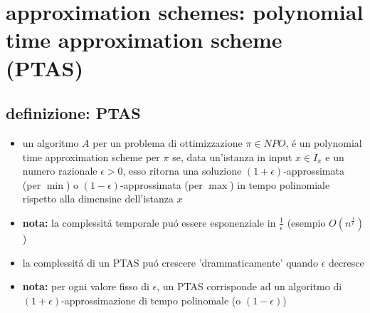 \section*{approximation schemes: polynomial time approximation scheme (PTAS)}


\subsection*{definizione: PTAS}
\begin{flushleft}
	\begin{itemize}
		\item un algoritmo $A$ per un problema di ottimizzazione $\pi\in NPO$, \'e un polynomial time approximation scheme per $\pi$ se, data un'istanza in input $x\in I_\pi$ e un numero razionale $\epsilon>0$, esso ritorna una soluzione $(1+\epsilon)$-approssimata (per $\min$) o $(1-\epsilon)$-approssimata (per $\max$) in tempo polinomiale rispetto alla dimensine dell'istanza $x$
		\item \textbf{nota:} la complessit\'a temporale pu\'o essere esponenziale in $\frac{1}{\epsilon}$ (esempio $O(n^\frac{1}{\epsilon})$)
		\item la complessit\'a di un PTAS pu\'o crescere 'drammaticamente' quando $\epsilon$ decresce
		\item \textbf{nota:} per ogni valore fisso di $\epsilon$, un PTAS corrisponde ad un algoritmo di $(1+\epsilon)$-approssimazione di tempo polinomale (o $(1-\epsilon)$)
	\end{itemize}
\end{flushleft}



